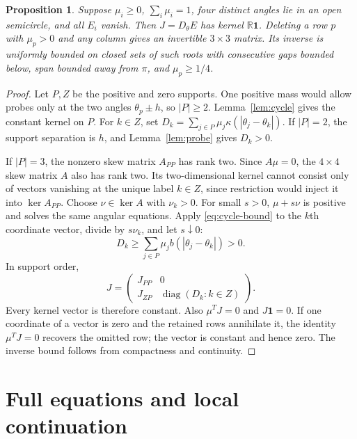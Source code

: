 \documentclass[11pt,a4paper]{article}
\numberwithin{equation}{section}
\newtheorem{proposition}[theorem]{Proposition}
\theoremstyle{remark}
\newcommand{\R}{\mathbb R}
\newcommand{\one}{\boldsymbol{1}}
\newcommand{\diag}{\operatorname{diag}}
\begin{document}
\begin{proposition}\label{prop:closed}
Suppose $\mu_i\ge0$, $\sum_i\mu_i=1$, four distinct angles lie in an open semicircle, and all $E_i$ vanish. Then $J=D_\theta E$ has kernel $\R\one$.
Deleting a row $p$ with $\mu_p>0$ and any column gives an invertible $3\times3$ matrix. Its inverse is uniformly bounded on closed sets of such roots with consecutive gaps bounded below, span bounded away from $\pi$, and $\mu_p\ge1/4$.
\end{proposition}
\begin{proof}
Let $P,Z$ be the positive and zero supports. One positive mass would allow probes only at the two angles $\theta_p\pm h$, so $|P|\ge2$. Lemma~\ref{lem:cycle} gives the constant kernel on $P$. For $k\in Z$, set
$D_k=\sum_{j\in P}\mu_j\kappa(|\theta_j-\theta_k|)$.
If $|P|=2$, the support separation is $h$, and Lemma~\ref{lem:probe} gives $D_k>0$.

If $|P|=3$, the nonzero skew matrix $A_{PP}$ has rank two. Since $A\mu=0$, the $4\times4$ skew matrix $A$ also has rank two. Its two-dimensional kernel cannot consist only of vectors vanishing at the unique label $k\in Z$, since restriction would inject it into $\ker A_{PP}$. Choose $\nu\in\ker A$ with $\nu_k>0$. For small $s>0$, $\mu+s\nu$ is positive and solves the same angular equations. Apply \eqref{eq:cycle-bound} to the $k$th coordinate vector, divide by $s\nu_k$, and let $s\downarrow0$:
\[
 D_k\ge\sum_{j\in P}\mu_j b(|\theta_j-\theta_k|)>0.
\]
In support order,
\[
 J=\begin{pmatrix}J_{PP}&0\\J_{ZP}&\diag(D_k:k\in Z)\end{pmatrix}.
\]
Every kernel vector is therefore constant. Also $\mu^TJ=0$ and $J\one=0$.
If one coordinate of a vector is zero and the retained rows annihilate it, the identity $\mu^TJ=0$ recovers the omitted row; the vector is constant and hence zero. The inverse bound follows from compactness and continuity.
\end{proof}

\section{Full equations and local continuation}\label{sec:variation}
\end{document}
